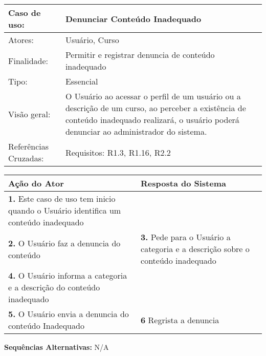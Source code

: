 \documentclass[12pt,a4paper,onecolumn,titlepage]{article}
\begin{document}
\newpage

\begin{table}[h!]
\begin{center}
\begin{tabular}{p{2.5cm} p{9.5cm}}
Caso de uso: & \textbf{Denunciar Conteúdo Inadequado} \\ \hline
Atores: & Usuário, Curso \\ \hline
Finalidade: & Permitir e registrar denuncia de conteúdo inadequado\\ \hline
Tipo: & Essencial \\ \hline
Visão geral: & O Usuário ao acessar o perfil de um usuário ou a descrição de um curso, ao perceber a existência de conteúdo inadequado realizará, o usuário poderá denunciar ao administrador do sistema. \\ \hline
Referências Cruzadas: & Requisitos: R1.3, R1.16, R2.2\\

\end{tabular}
\end{center}
\end{table} 


\begin{center}
\def\arraystretch{1.1}
\begin{tabular}{|p{6cm}|p{6cm}|}

\hline
\textbf{Ação do Ator} & \textbf{Resposta do Sistema} \\ \hline
\textbf{1.} Este caso de uso tem inicio quando o Usuário identifica um conteúdo inadequado & \\ \hline
\textbf{2.} O Usuário faz a denuncia do conteúdo  & \textbf{3.} Pede para o Usuário a categoria e a descrição sobre o conteúdo inadequado  \\ \hline
\textbf{4.} O Usuário informa a categoria e a descrição do conteúdo inadequado & \\ \hline
\textbf{5.} O Usuário envia a denuncia do conteúdo Inadequado & \textbf{6} Regrista a denuncia \\ \hline
\end{tabular}
\end{center}

\textbf{Sequências Alternativas:} N/A

\newpage
\end{document}
